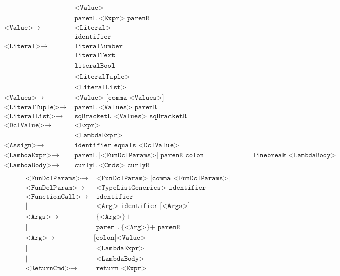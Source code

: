 \begin{landscape}
\begin{align*}
	| & \texttt{ <Value>}\\
	| & \texttt{ parenL <Expr> parenR }\\
	\texttt{<Value>}\to & \texttt{ <Literal>}\\
	| & \texttt{ identifier}\\
	\texttt{<Literal>}\to & \texttt{ literalNumber}\\
	| & \texttt{ literalText}\\
	| & \texttt{ literalBool}\\
	| & \texttt{ <LiteralTuple>}\\
	| & \texttt{ <LiteralList>}\\
	\texttt{<Values>}\to & \texttt{ <Value> [comma <Values>]}\\
	\texttt{<LiteralTuple>}\to & \texttt{ parenL <Values> parenR}\\
	\texttt{<LiteralList>}\to & \texttt{ sqBracketL <Values> sqBracketR}\\
	\texttt{<DclValue>}\to & \texttt{ <Expr>}\\
	| & \texttt{ <LambdaExpr>}\\
	\texttt{<Assign>}\to & \texttt{ identifier equals <DclValue>}\\
	\texttt{<LambdaExpr>}\to & \texttt{ parenL [<FunDclParams>] parenR colon <TypeNoneAndGenerics> {linebreak} <LambdaBody>}\\
	\texttt{<LambdaBody>}\to & \texttt{ curlyL <Cmds> curlyR}\\
\end{align*} %
\begin{align*}
	\texttt{<FunDclParams>}\to & \texttt{ <FunDclParam> [comma <FunDclParams>]}\\
	\texttt{<FunDclParam>}\to & \texttt{ <TypeListGenerics> identifier}\\
	\texttt{<FunctionCall>}\to & \texttt{ identifier}\\
	| & \texttt{ <Arg> identifier [<Args>]}\\
	\texttt{<Args>}\to & \texttt{ \{<Arg>\}+}\\
	| & \texttt{ parenL \{<Arg>\}+ parenR}\\
	\texttt{<Arg>}\to & \texttt{[colon]<Value>}\\
	| & \texttt{ <LambdaExpr>}\\
	| & \texttt{ <LambdaBody>}\\
	\texttt{<ReturnCmd>}\to & \texttt{ return <Expr>}
\end{align*}
\end{landscape}
\newpage